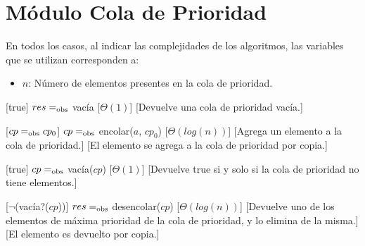 \section{M\'{o}dulo Cola de Prioridad}

  En todos los casos, al indicar las complejidades de los algoritmos, las variables que se utilizan corresponden a:
  \vspace{-0.5em}\begin{itemize}
    \item $n$: N\'umero de elementos presentes en la cola de prioridad.
  \end{itemize}


\begin{Interfaz}
  
  \begin{paramFormales}
    \paramGeneros{$\alpha$}



  \end{paramFormales}




    [true]
    {$res =_{\mathrm{obs}}$ vac\'ia}
    [$\Theta(1)$]
    [Devuelve una cola de prioridad vac\'ia.]

    [$cp =_{\mathrm{obs}} cp_0$]
    {$cp =_{\mathrm{obs}}$ encolar($a$, $cp_0$)}
    [$\Theta(log(n))$]
    [Agrega un elemento a la cola de prioridad.]
    [El elemento se agrega a la cola de prioridad por copia.]

    [true]
    {$cp =_{\mathrm{obs}}$ vac\'ia($cp$)}
    [$\Theta(1)$]
    [Devuelve true si y solo si la cola de prioridad no tiene elementos.]

    [$\neg$(vac\'ia?($cp$))]
    {$res =_{\mathrm{obs}}$ desencolar($cp$)}
    [$\Theta(log(n))$]
    [Devuelve uno de los elementos de m\'axima prioridad de la cola de prioridad, y lo elimina de la misma.]
    [El elemento es devuelto por copia.]

\end{Interfaz}

